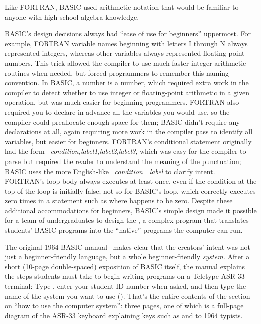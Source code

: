 Like FORTRAN, BASIC used arithmetic notation that would be familiar to
anyone with high school algebra knowledge.

BASIC's design decisions always had ``ease of use for beginners''
uppermost.  For example, FORTRAN variable names beginning with letters I
through N 
always represented integers, whereas other variables always represented
floating-point numbers.
This trick allowed the compiler to use much faster integer-arithmetic
routines when needed, but forced programmers to remember this naming
convention.  In BASIC,  a number is a number, which required extra work in
the compiler to detect whether to use integer or floating-point
arithmetic in a given operation, but was much easier for beginning
programmers.
FORTRAN also required you to declare in advance all the variables you
would use, so the compiler could preallocate enough space for them;
BASIC didn't require any declarations at all, again
requiring more work in the compiler pass to identify all
variables, but easier for beginners.
FORTRAN's conditional statement originally had the form
~\emph{condition,label1,label2,label3}, which was easy for the
compiler to parse but required the reader to understand the meaning of
the punctuation; BASIC uses the more English-like
~\emph{condition}~~\emph{label} to clarify intent.
FORTRAN's  loop body always executes at least once, even if the
condition at the top of the loop is initially false; not so for
BASIC's  loop, which correctly executes zero times
in a statement such as  where  happens to be
zero.
Despite these additional accommodations for beginners,
BASIC's simple design made it possible for a team of undergraduates to
design the , a complex program that translates students'
BASIC programs into the ``native'' programs the computer can run.

The original 1964 BASIC manual~\cite[p. 14]{dartmouth_basic_manual}
makes clear that the creators' intent was not just a beginner-friendly
language, but a whole beginner-friendly \emph{system.}
After a short (10-page double-spaced) exposition of BASIC itself, the
manual explains the steps students must take to begin writing programs
on a Teletype ASR-33 terminal: Type , enter your student ID
number when asked, and then type the name of the system you want to use
().
That's the entire contents of the section on ``how to use the computer
system'': three pages, one of which is a full-page diagram of the ASR-33
keyboard explaining keys such as  and  to 1964
typists.

